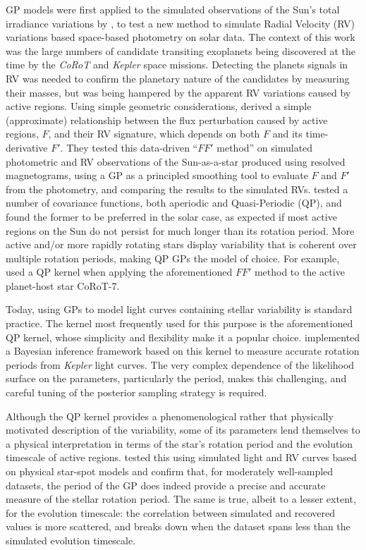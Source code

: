 \documentclass[letterpaper]{ar-1col}
\begin{document}
GP models were first applied to the simulated observations of the Sun's total irradiance variations by \citet{2012MNRAS.419.3147A}, to test a new method to simulate Radial Velocity (RV) variations based space-based photometry on solar data. The context of this work was the large numbers of candidate transiting exoplanets being discovered at the time by the \textit{CoRoT} and \textit{Kepler} space missions. Detecting the planets signals in RV was needed to confirm the planetary nature of the candidates by measuring their masses, but was being hampered by the apparent RV variations caused by active regions. Using simple geometric considerations, \citet{2012MNRAS.419.3147A} derived a simple (approximate) relationship between the flux perturbation caused by active regions, $F$, and their RV signature, which depends on both $F$ and its time-derivative $F'$. They tested this data-driven ``$FF'$ method'' on simulated photometric and RV observations of the Sun-as-a-star produced using resolved magnetograms, using a GP as a principled smoothing tool to evaluate $F$ and $F'$ from the photometry, and comparing the results to the simulated RVs. \citet{2012MNRAS.419.3147A}  tested a number of covariance functions, both aperiodic and Quasi-Periodic (QP), and found the former to be preferred in the solar case, as expected if most active regions on the Sun do not persist for much longer than its rotation period. More active and/or more rapidly rotating stars display variability that is coherent over multiple rotation periods, making QP GPs the model of choice. For example, \citet{2014MNRAS.443.2517H} used a QP kernel when applying the aforementioned $FF'$ method to the active planet-host star CoRoT-7.

Today, using GPs to model light curves containing stellar variability is standard practice. The kernel most frequently used for this purpose is the aforementioned QP kernel, whose simplicity and flexibility make it a popular choice. \citet{2018MNRAS.474.2094A} implemented a Bayesian inference framework based on this kernel to measure accurate rotation periods from \textit{Kepler} light curves. The very complex dependence of the likelihood surface on the parameters, particularly the period, makes this challenging, and careful tuning of the posterior sampling strategy is required.

Although the QP kernel provides a phenomenological rather that physically motivated description of the variability, some of its parameters lend themselves to a physical interpretation in terms of the star's rotation period and the evolution timescale of active regions. \citet{2022MNRAS.tmp.2007N} tested this using simulated light and RV curves based on physical star-spot models and confirm that, for moderately well-sampled datasets, the period of the GP does indeed provide a precise and accurate measure of the stellar rotation period. The same is true, albeit to a lesser extent, for the evolution timescale: the correlation between simulated and recovered values is more scattered, and breaks down when the dataset spans less than the simulated evolution timescale.
\end{document}

